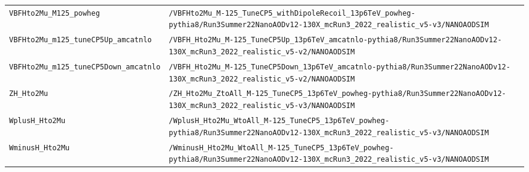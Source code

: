 \begin{longtable}{@{}>{\RaggedRight\arraybackslash}p{} >{\RaggedRight\arraybackslash}p{}@{}}
\addlinespace[2pt]
\texttt{VBFHto2Mu\_\allowbreak{}M125\_\allowbreak{}powheg} & \texttt{/\allowbreak{}VBFHto2Mu\_\allowbreak{}M-\allowbreak{}125\_\allowbreak{}TuneCP5\_\allowbreak{}withDipoleRecoil\_\allowbreak{}13p6TeV\_\allowbreak{}powheg-\allowbreak{}pythia8/\allowbreak{}Run3Summer22NanoAODv12-\allowbreak{}130X\_\allowbreak{}mcRun3\_\allowbreak{}2022\_\allowbreak{}realistic\_\allowbreak{}v5-\allowbreak{}v3/\allowbreak{}NANOAODSIM} \\
\addlinespace[2pt]
\texttt{VBFHto2Mu\_\allowbreak{}m125\_\allowbreak{}tuneCP5Up\_\allowbreak{}amcatnlo} & \texttt{/\allowbreak{}VBFH\_\allowbreak{}Hto2Mu\_\allowbreak{}M-\allowbreak{}125\_\allowbreak{}TuneCP5Up\_\allowbreak{}13p6TeV\_\allowbreak{}amcatnlo-\allowbreak{}pythia8/\allowbreak{}Run3Summer22NanoAODv12-\allowbreak{}130X\_\allowbreak{}mcRun3\_\allowbreak{}2022\_\allowbreak{}realistic\_\allowbreak{}v5-\allowbreak{}v2/\allowbreak{}NANOAODSIM} \\
\addlinespace[2pt]
\texttt{VBFHto2Mu\_\allowbreak{}m125\_\allowbreak{}tuneCP5Down\_\allowbreak{}amcatnlo} & \texttt{/\allowbreak{}VBFH\_\allowbreak{}Hto2Mu\_\allowbreak{}M-\allowbreak{}125\_\allowbreak{}TuneCP5Down\_\allowbreak{}13p6TeV\_\allowbreak{}amcatnlo-\allowbreak{}pythia8/\allowbreak{}Run3Summer22NanoAODv12-\allowbreak{}130X\_\allowbreak{}mcRun3\_\allowbreak{}2022\_\allowbreak{}realistic\_\allowbreak{}v5-\allowbreak{}v2/\allowbreak{}NANOAODSIM} \\
\addlinespace[2pt]
\texttt{ZH\_\allowbreak{}Hto2Mu} & \texttt{/\allowbreak{}ZH\_\allowbreak{}Hto2Mu\_\allowbreak{}ZtoAll\_\allowbreak{}M-\allowbreak{}125\_\allowbreak{}TuneCP5\_\allowbreak{}13p6TeV\_\allowbreak{}powheg-\allowbreak{}pythia8/\allowbreak{}Run3Summer22NanoAODv12-\allowbreak{}130X\_\allowbreak{}mcRun3\_\allowbreak{}2022\_\allowbreak{}realistic\_\allowbreak{}v5-\allowbreak{}v3/\allowbreak{}NANOAODSIM} \\
\addlinespace[2pt]
\texttt{WplusH\_\allowbreak{}Hto2Mu} & \texttt{/\allowbreak{}WplusH\_\allowbreak{}Hto2Mu\_\allowbreak{}WtoAll\_\allowbreak{}M-\allowbreak{}125\_\allowbreak{}TuneCP5\_\allowbreak{}13p6TeV\_\allowbreak{}powheg-\allowbreak{}pythia8/\allowbreak{}Run3Summer22NanoAODv12-\allowbreak{}130X\_\allowbreak{}mcRun3\_\allowbreak{}2022\_\allowbreak{}realistic\_\allowbreak{}v5-\allowbreak{}v3/\allowbreak{}NANOAODSIM} \\
\addlinespace[2pt]
\texttt{WminusH\_\allowbreak{}Hto2Mu} & \texttt{/\allowbreak{}WminusH\_\allowbreak{}Hto2Mu\_\allowbreak{}WtoAll\_\allowbreak{}M-\allowbreak{}125\_\allowbreak{}TuneCP5\_\allowbreak{}13p6TeV\_\allowbreak{}powheg-\allowbreak{}pythia8/\allowbreak{}Run3Summer22NanoAODv12-\allowbreak{}130X\_\allowbreak{}mcRun3\_\allowbreak{}2022\_\allowbreak{}realistic\_\allowbreak{}v5-\allowbreak{}v3/\allowbreak{}NANOAODSIM} \\

\end{longtable}
